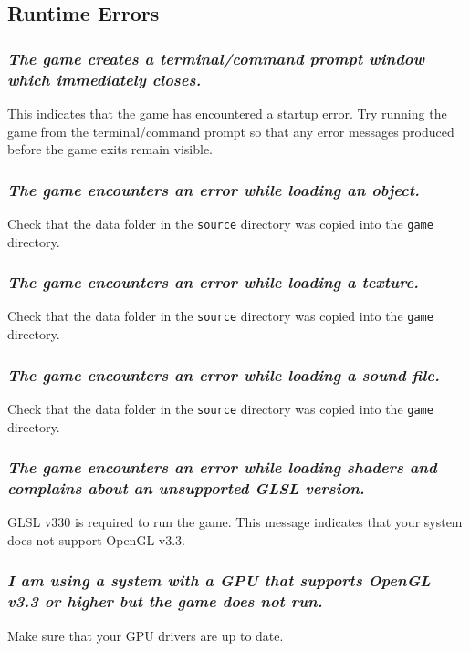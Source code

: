 \documentclass[12pt, titlepage]{article}
\begin{document}
\subsection{Runtime Errors}
\subsubsection{\emph{The game creates a terminal/command prompt window which immediately closes.}}
\noindent This indicates that the game has encountered a startup error.  Try running the game from the terminal/command prompt so that any error messages produced before the game exits remain visible.

\subsubsection{\emph{The game encounters an error while loading an object.}}
\noindent Check that the data folder in the \texttt{source} directory was copied into the \texttt{game} directory.  

\subsubsection{\emph{The game encounters an error while loading a texture.}}
\noindent Check that the data folder in the \texttt{source} directory was copied into the \texttt{game} directory.

\subsubsection{\emph{The game encounters an error while loading a sound file.}}
\noindent Check that the data folder in the \texttt{source} directory was copied into the \texttt{game} directory.

\subsubsection{\emph{The game encounters an error while loading shaders and complains about an unsupported GLSL version.}}
\noindent GLSL v330 is required to run the game.  This message indicates that your system does not support OpenGL v3.3.

\subsubsection{\emph{I am using a system with a GPU that supports OpenGL v3.3 or higher but the game does not run.}}
\noindent Make sure that your GPU drivers are up to date.
\end{document}
